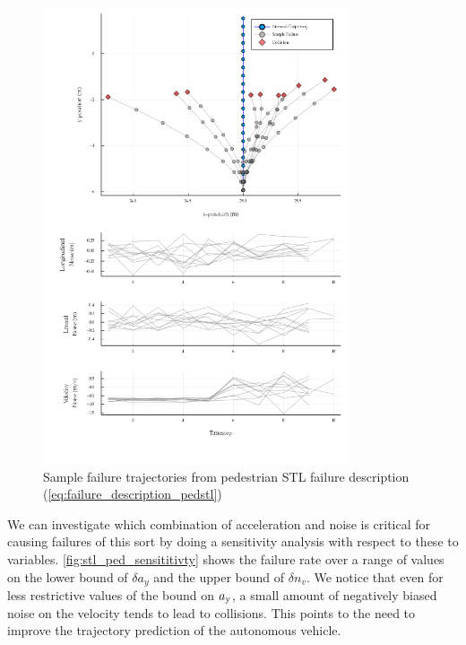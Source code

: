 \begin{figure}
    \includegraphics[width=0.8\textwidth]{figures/interpretable_validation/stl_failure_examples.png}
    \caption{Sample failure trajectories from pedestrian STL failure description (\cref{eq:failure_description_pedstl})}
    \label{fig:ped_stl_sample_failures}
\end{figure}

We can investigate which combination of acceleration and noise is critical for causing failures of this sort by doing a sensitivity analysis with respect to these to variables. \cref{fig:stl_ped_sensititivty} shows the failure rate over a range of values on the lower bound of $\delta a_y$ and the upper bound of $\delta n_v$. We notice that even for less restrictive values of the bound on $a_{\rm y}$, a small amount of negatively biased noise on the velocity tends to lead to collisions. This points to the need to improve the trajectory prediction of the autonomous vehicle. 

